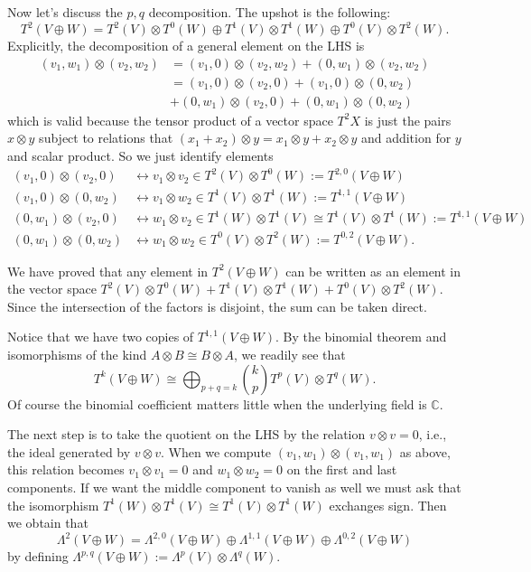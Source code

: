 \documentclass{book}
\begin{document}
Now let's discuss the $p,q$ decomposition.
The upshot is the following:
$$
T^2(V \oplus  W)=
T^2(V)\otimes T^0(W)
\oplus T^1(V)\otimes T^1(W)
\oplus T^0(V)\otimes T^2(W).
$$
Explicitly, the decomposition of a general
element on the LHS is
$$
\begin{aligned}
(v_1,w_1)\otimes(v_2,w_2)
&=(v_1,0)\otimes(v_2,w_2)+(0,w_1)\otimes(v_2,
w_2)\\
&=(v_1,0)\otimes(v_2,0)+(v_1,0)\otimes(0,w_2)
\\
&+(0,w_1)\otimes(v_2,0)+(0,w_1)\otimes(0,w_2)
\end{aligned}
$$
which is valid because the tensor product of
a vector space
$T^2X$ is just the pairs $x \otimes y$
subject
to relations that $(x_1+x_2)\otimes y=x_1
\otimes y+x_2\otimes y$
and addition for $y$ and scalar product.
So we just identify elements
$$
\begin{aligned}
(v_1,0)\otimes(v_2,0)
&\leftrightarrow
v_1 \otimes v_2 \in T^2(V) \otimes
T^0(W):=T^{2,0}(V \oplus W)\\
(v_1,0)\otimes(0,w_2)
&\leftrightarrow
v_1 \otimes w_2 \in T^1(V) \otimes T^1(W):=
T^{1,1}(V\oplus W)\\
(0,w_1)\otimes(v_2,0)
&\leftrightarrow
w_1 \otimes v_2 \in T^1(W) \otimes  T^1(V)
\cong T^1(V) \otimes  T^1(W):=T^{1,1}(V\oplus
W)\\
(0,w_1)\otimes(0,w_2)
&\leftrightarrow
w_1\otimes w_2 \in T^0(V) \otimes
T^2(W):=T^{0,2}(V \oplus  W).
\end{aligned}
$$

\noindent
We have proved that any element in $T^2(V
\oplus W)$
can be written as an element in the vector
space
$T^2(V)\otimes T^0(W)
+ T^1(V)\otimes T^1(W)
+ T^0(V)\otimes T^2(W)$.
Since the intersection of the factors is
disjoint,
the sum can be taken direct.

\medskip\noindent
Notice that we have two copies of
$T^{1,1}(V\oplus W)$.
By the binomial theorem and isomorphisms
of the kind $A \otimes B \cong B \otimes A$,
we readily see that
 $$
T^k(V \oplus W)
\cong
\bigoplus_{p+q=k}\binom{k}{p}T^p(V)\otimes
T^q(W).
$$
Of course the binomial coefficient matters
little
when the underlying field is $\mathbb{C}$.

The next step is to take the quotient on the
LHS
by the relation $v \otimes v=0$,
i.e., the ideal generated by $v \otimes v$.
When we compute $(v_1,w_1)\otimes(v_1,w_1)$
as above,
this relation becomes $v_1 \otimes v_1=0$
and $w_1\otimes w_2=0$ on the first and last
components.
If we want the middle component to vanish as
well
we must ask that the isomorphism
$T^1(W) \otimes  T^1(V)\cong T^1(V) \otimes
T^1(W)$
exchanges sign. Then we obtain that
$$
\Lambda^2(V \oplus W)
=\Lambda^{2,0}(V\oplus W)
\oplus\Lambda^{1,1}(V\oplus W)
\oplus\Lambda^{0,2}(V \oplus W)
$$
by defining $\Lambda^{p,q}(V \oplus
W):=\Lambda^p(V)\otimes \Lambda^q(W)$.
\end{document}
